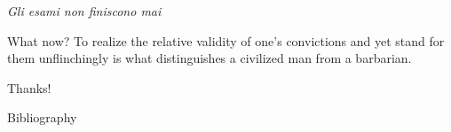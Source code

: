 \documentclass{beamer}
\begin{document}
	\begin{frame}{\textit{Gli esami non finiscono mai}}
		\begin{block}{What now?}
			{\large To realize the relative validity of one's convictions and yet stand for them unflinchingly is what distinguishes a civilized man from a barbarian.}
			\vskip5mm
			\hspace*{}
		\end{block}
		\centering\LARGE Thanks!
	\end{frame}

	\begin{frame}[allowframebreaks]{Bibliography}
		\nocite{*}
		\printbibliography
	\end{frame}
	
\end{document}
